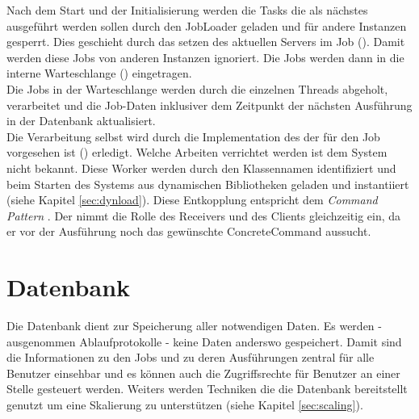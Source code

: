 Nach dem Start und der Initialisierung werden die Tasks die als nächstes ausgeführt werden sollen durch den JobLoader geladen und für andere Instanzen gesperrt. Dies geschieht durch das setzen des aktuellen Servers im Job (). Damit werden diese Jobs von anderen Instanzen ignoriert. Die Jobs werden dann in die interne Warteschlange () eingetragen.
\\Die Jobs in der Warteschlange werden durch die einzelnen Threads abgeholt, verarbeitet und die Job-Daten inklusiver dem Zeitpunkt der nächsten Ausführung in der Datenbank aktualisiert.
\\Die Verarbeitung selbst wird durch die Implementation des  der für den Job vorgesehen ist () erledigt. Welche Arbeiten verrichtet werden ist dem System nicht bekannt. Diese Worker werden durch den Klassennamen identifiziert und beim Starten des Systems aus dynamischen Bibliotheken geladen und instantiiert (siehe Kapitel \ref{sec:dynload}). Diese Entkopplung entspricht dem \emph{Command Pattern} \parencite{gamma1995}. Der  nimmt die Rolle des Receivers und des Clients gleichzeitig ein, da er vor der Ausführung noch das gewünschte ConcreteCommand aussucht.

\section{Datenbank}
Die Datenbank dient zur Speicherung aller notwendigen Daten. Es werden - ausgenommen Ablaufprotokolle - keine Daten anderswo gespeichert. Damit sind die Informationen zu den Jobs und zu deren Ausführungen zentral für alle Benutzer einsehbar und es können auch die Zugriffsrechte für Benutzer an einer Stelle gesteuert werden. Weiters werden Techniken die die Datenbank bereitstellt genutzt um eine Skalierung zu unterstützen (siehe Kapitel \ref{sec:scaling}).
